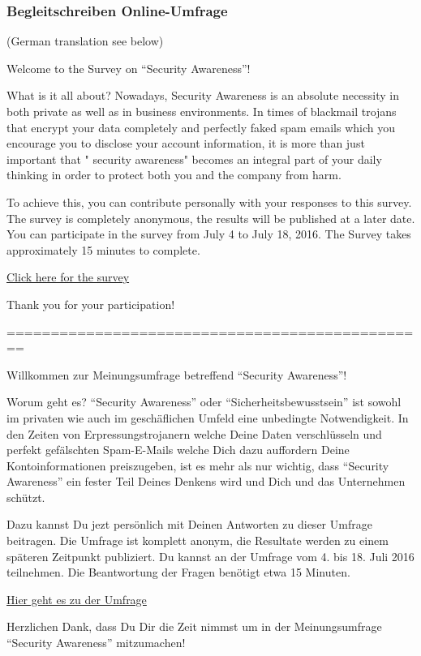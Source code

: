 \documentclass[../../main.tex]{subfiles}
\begin{document}
\subsubsection*{Begleitschreiben Online-Umfrage}
\label{begleitschreiben_online_umfrage}

\begin{sloppypar}

{\selectfont
\footnotesize

(German translation see below)

Welcome to the Survey on ``Security Awareness''!

What is it all about? Nowadays, Security Awareness is an absolute necessity in both private as well as in business environments. In times of blackmail trojans that encrypt your data completely and perfectly faked spam emails which you encourage you to disclose your account information, it is more than just important that " security awareness" becomes an integral part of your daily thinking in order to protect both you and the company from harm.

To achieve this, you can contribute personally with your responses to this survey. The survey is completely anonymous, the results will be published at a later date. You can participate in the survey from July 4 to July 18, 2016. The Survey takes approximately 15 minutes to complete.

\underline{Click here for the survey}

Thank you for your participation!

================================================

Willkommen zur Meinungsumfrage betreffend ``Security Awareness''!

Worum geht es? ``Security Awareness'' oder ``Sicherheitsbewusstsein'' ist sowohl im privaten wie auch im geschäflichen Umfeld eine unbedingte Notwendigkeit. In den Zeiten von Erpressungstrojanern welche Deine Daten verschlüsseln und perfekt gefälschten Spam-E-Mails welche Dich dazu auffordern Deine Kontoinformationen preiszugeben, ist es mehr als nur wichtig, dass ``Security Awareness'' ein fester Teil Deines Denkens wird und Dich und das Unternehmen schützt.

Dazu kannst Du jezt persönlich mit Deinen Antworten zu dieser Umfrage beitragen. Die Umfrage ist komplett anonym, die Resultate werden zu einem späteren Zeitpunkt publiziert. Du kannst an der Umfrage vom 4. bis 18. Juli 2016 teilnehmen. Die Beantwortung der Fragen benötigt etwa 15 Minuten.

\underline{Hier geht es zu der Umfrage}

Herzlichen Dank, dass Du Dir die Zeit nimmst um in der Meinungsumfrage ``Security Awareness'' mitzumachen!

}
\normalsize
\end{sloppypar}
\end{document}
